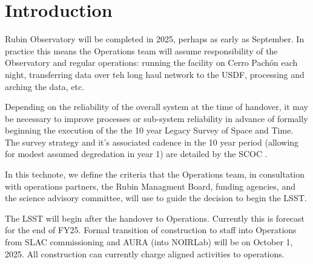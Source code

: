 \section{Introduction}

Rubin Observatory will be completed in 2025, perhaps as early as September. In practice this means the Operations team \cite[see][]{RDO-018} will assume responsibility of the Observatory and regular operations: running the facility on Cerro Pach\'{o}n each night, transferring data over teh long haul network to the USDF, processing and arching the data, etc. 

Depending on the reliability of the overall system at the time of handover, it may be necessary to improve processes or sub-system reliability in advance of formally beginning the execution of the the 10 year Legacy Survey of Space and Time. The survey strategy and it's associated cadence in the 10 year period (allowing for modest assumed degredation in year 1) are detailed by the SCOC \cite[]{PSTN-056}. 

In this technote, we define the criteria that the Operations team, in consultation with operations partners, the Rubin Managment Board, funding agencies, and the science advisory committee, will use to guide the decision to begin the LSST. 

The LSST will begin after the handover to Operations. Currently this is forecast for the end of FY25. Formal transition of construction to staff into Operations from SLAC commissioning and AURA (into NOIRLab) will be on October 1, 2025. All construction can currently charge aligned activities to operations. 

